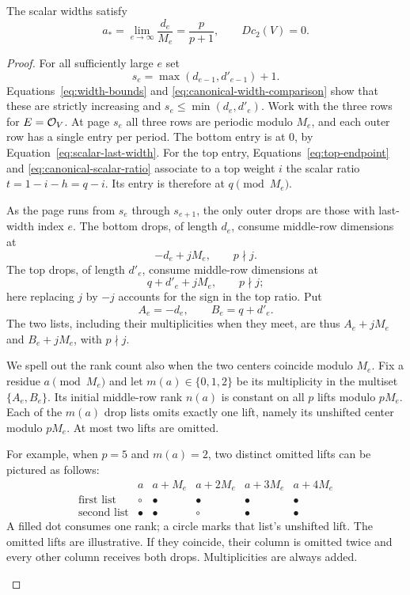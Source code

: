 \begin{proposition}\label{prop:scalar-widths}
The scalar widths satisfy
\begin{equation}\label{eq:limiting-width}
 a_*=\lim_{e\to\infty}\frac{d_e}{M_e}
 =\frac{p}{p+1},\qquad Dc_2(V)=0.
\end{equation}
\end{proposition}

\begin{proof}
For all sufficiently large $e$ set
\[
 s_e=\max(d_{e-1},d'_{e-1})+1.
\]
Equations~\ref{eq:width-bounds} and
\ref{eq:canonical-width-comparison} show that these are
strictly increasing and
$s_e\leq\min(d_e,d'_e)$. Work with the three rows for
$E=\mathcal O_V$. At page $s_e$ all three rows are periodic
modulo $M_e$, and each outer row has a single entry per period. The bottom
entry is at $0$, by Equation~\ref{eq:scalar-last-width}.
For the top entry, Equations~\ref{eq:top-endpoint} and
\ref{eq:canonical-scalar-ratio} associate to a top weight
$i$ the scalar ratio $t=1-i-h=q-i$. Its entry is therefore
at $q\pmod{M_e}$.

As the page runs from $s_e$ through $s_{e+1}$, the only
outer drops are those with last-width index $e$.
The bottom drops, of length $d_e$, consume middle-row
dimensions at
\[
 -d_e+jM_e,\qquad p\nmid j.
\]
The top drops, of length $d'_e$, consume middle-row
dimensions at
\[
 q+d'_e+jM_e,\qquad p\nmid j;
\]
here replacing $j$ by $-j$ accounts for the sign in the
top ratio. Put
\[
 A_e=-d_e,\qquad B_e=q+d'_e.
\]
The two lists, including their multiplicities when they
meet, are thus $A_e+jM_e$ and $B_e+jM_e$, with $p\nmid j$.

We spell out the rank count also when the two centers
coincide modulo $M_e$. Fix a residue $a\pmod{M_e}$ and
let $m(a)\in\{0,1,2\}$ be its multiplicity in the multiset
$\{A_e,B_e\}$. Its initial middle-row rank $n(a)$ is
constant on all $p$ lifts modulo $pM_e$. Each of the
$m(a)$ drop lists omits exactly one lift, namely its
unshifted center modulo $pM_e$. At most two lifts are
omitted.

\begin{samepage}
For example, when $p=5$ and $m(a)=2$, two
distinct omitted lifts can be pictured as follows:
\[
\begin{array}{c|ccccc}
 & a&a+M_e&a+2M_e&a+3M_e&a+4M_e\\
 \text{first list}&\circ&\bullet&\bullet&\bullet&\bullet\\
 \text{second list}&\bullet&\bullet&\circ&\bullet&\bullet
\end{array}
\]
A filled dot consumes one rank; a circle marks that list's
unshifted lift. The omitted lifts are illustrative. If they
coincide, their column is omitted twice and every other
column receives both drops. Multiplicities are always added.
\end{samepage}


\end{proof}
